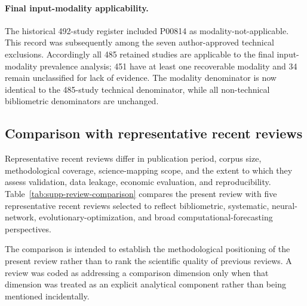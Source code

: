 \documentclass[12pt]{article}
\numberwithin{equation}{section}
\begin{document}
\paragraph{Final input-modality applicability.}
The historical 492-study register included P00814 as modality-not-applicable.
This record was subsequently among the seven author-approved technical
exclusions. Accordingly all 485 retained studies are applicable to the
final input-modality prevalence analysis; 451 have at least one
recoverable modality and 34 remain unclassified for lack of evidence.
The modality denominator is now identical to the 485-study technical
denominator, while all non-technical bibliometric denominators are unchanged.

\subsection{Comparison with representative recent reviews}
\label{sec:supp-review-comparison}

Representative recent reviews differ in publication period, corpus size,
methodological coverage, science-mapping scope, and the extent to which
they assess validation, data leakage, economic evaluation, and
reproducibility. Table~\ref{tab:supp-review-comparison} compares the
present review with five representative recent reviews selected to reflect
bibliometric, systematic, neural-network, evolutionary-optimization, and
broad computational-forecasting perspectives.

The comparison is intended to establish the methodological positioning of
the present review rather than to rank the scientific quality of previous
reviews. A review was coded as addressing a comparison dimension only when
that dimension was treated as an explicit analytical component rather than
being mentioned incidentally.
\end{document}
